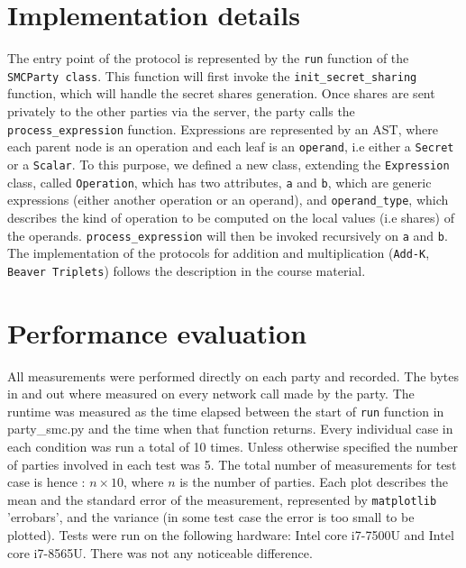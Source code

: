 \documentclass[10pt,conference,compsocconf]{IEEEtran}
\begin{document}
\section{Implementation details}
The entry point of the protocol is represented by the \texttt{run} function of the \texttt{SMCParty class}.
This function will first invoke the \texttt{init\_secret\_sharing} function, which will handle the secret shares generation.
Once shares are sent privately to the other parties via the server, the party calls the \texttt{process\_expression} function.
Expressions are represented by an AST, where each parent node is an operation and each leaf is an \texttt{operand}, i.e either a \texttt{Secret} or a \texttt{Scalar}.
To this purpose, we defined a new class, extending the \texttt{Expression} class, called \texttt{Operation}, which has two attributes, \texttt{a} and \texttt{b},
which are generic expressions (either another operation or an operand), and \texttt{operand\_type}, which describes the kind of operation to be computed on the local values (i.e shares)
of the operands. \texttt{process\_expression} will then be invoked recursively on \texttt{a} and \texttt{b}.
The implementation of the protocols for addition and multiplication (\texttt{Add-K}, \texttt{Beaver Triplets}) follows the description in the course material.
\section{Performance evaluation}
All measurements were performed directly on each party and recorded.
The bytes in and out where measured on every
network call made by the party.
The runtime was measured as the time elapsed between the start of \texttt{run} function in
party\_smc.py and the time when that function returns.
Every individual case in each condition was run a total of 10 times.
Unless otherwise specified the number of parties involved in each test was 5.
The total number of measurements for test case is hence : $n \times 10$, where $n$ is the number of parties.
Each plot describes the mean and the standard error of the measurement, represented by \texttt{matplotlib} 'errobars', and the variance (in some test case the error is too small to be plotted).
Tests were run on the following hardware: Intel core i7-7500U and Intel core i7-8565U. There was not any noticeable difference.
\end{document}
